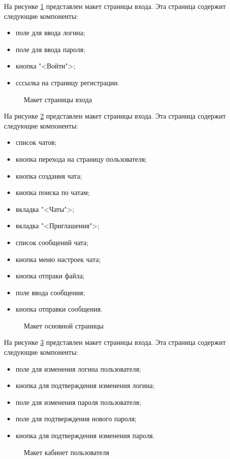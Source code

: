 На рисунке \ref{signin_maket:image} представлен макет страницы входа. Эта страница содержит следующие компоненты:
\begin{itemize}
	\item поле для ввода логина;
	\item поле для ввода пароля;
	\item кнопка "<Войти">;
	\item сссылка на страницу регистрации.
\end{itemize}

\begin{figure}[H]
	\caption{Макет страницы входа}
	\label{signin_maket:image}
\end{figure}

На рисунке \ref{main_maket:image} представлен макет страницы входа. Эта страница содержит следующие компоненты:
\begin{itemize}
	\item список чатов;
	\item кнопка перехода на страницу пользователя;
	\item кнопка создания чата;
	\item кнопка поиска по чатам;
	\item вкладка "<Чаты">;
	\item вкладка "<Приглашения">;
	\item список сообщений чата;
	\item кнопка меню настроек чата;
	\item кнопка отпраки файла;
	\item поле ввода сообщения;
	\item кнопка отправки сообщения.
\end{itemize}

\begin{figure}[H]
	\caption{Макет основной страницы}
	\label{main_maket:image}
\end{figure}

На рисунке \ref{cabinet_maket:image} представлен макет страницы входа. Эта страница содержит следующие компоненты:
\begin{itemize}
	\item поле для изменения логина пользователя;
	\item кнопка для подтверждения изменения логина;
	\item поле для изменения пароля пользователя;
	\item поле для подтверждения нового пароля;
	\item кнопка для подтверждения изменения пароля.
\end{itemize}

\begin{figure}[H]
	\caption{Макет кабинет пользователя}
	\label{cabinet_maket:image}
\end{figure}